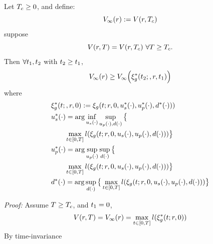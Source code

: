  \begin{claim}
   \label{thm:main}
   Let $T_c \ge 0$, and define:
      \begin{equation}
      \label{eq:conv_valfunc}
      V_\infty(r) := V(r, T_c)
      \end{equation}
   suppose
   \begin{equation}
   \label{eq:conv_valfunc}
   V(r, T) = V(r, T_c) ~ \forall T \ge T_c.
   \end{equation}
   Then $\forall t_1, t_2$ with $t_2 \ge t_1$,
   \begin{equation}
   \label{eq:invariant}
   V_\infty(r) \ge V_\infty\Big(\xi_g^*(t_2;, r, t_1)\Big)
   \end{equation}
   \noindent where
   \begin{equation}
   \begin{aligned}
   & \xi_g^*(t;, r, 0) := \xi_g(t; r, 0, u_s^*(\cdot), u_p^*(\cdot), d^*(\cdot))) \\
   & u_s^*(\cdot) = \arg \inf_{u_s(\cdot)} \sup_{u_p(\cdot), d(\cdot)}\big\{ \\
   & \qquad \max_{t \in [0, T]} l(\xi_g(t; r, 0, u_s(\cdot), u_p(\cdot), d(\cdot))) \big\}\\
   & u_p^*(\cdot) = \arg \sup_{u_p(\cdot)} \sup_{d(\cdot)} \big\{ \\
   & \qquad \max_{t \in [0, T]} l(\xi_g(t; r, 0, u_s(\cdot), u_p(\cdot), d(\cdot))) \big\} \\
   & d^*(\cdot) = \arg \sup_{d(\cdot)} \big\{\max_{t \in [0, T]} l(\xi_g(t; r, 0, u_s(\cdot), u_p(\cdot),  d(\cdot))) \big\}
   \end{aligned}
   \end{equation}
 \end{claim}
\textit{Proof:}
Assume $T \ge T_c$, and $t_1=0$,
\begin{equation}
\begin{aligned}
V(r, T) &= V_\infty(r) = \max_{t \in [0, T]} l(\xi_g^*(t; r, 0))\\
\end{aligned}
\end{equation}
By time-invariance
